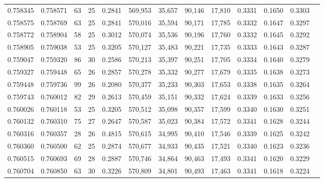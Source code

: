 \begin{tabular}{rrrrrrrrrrrrr}
0.758345 & 0.758571 &    63 &  25 &                                     0.2841 & 569,953 &  35,657 &  90,146 &  17,810 & 0.3331 & 0.1650 & 0.3303 \\
0.758575 & 0.758769 &    63 &  25 &                                     0.2841 & 570,016 &  35,594 &  90,171 &  17,785 & 0.3332 & 0.1647 & 0.3297 \\
0.758772 & 0.758904 &    58 &  25 &                                     0.3012 & 570,074 &  35,536 &  90,196 &  17,760 & 0.3332 & 0.1645 & 0.3292 \\
0.758905 & 0.759038 &    53 &  25 &                                     0.3205 & 570,127 &  35,483 &  90,221 &  17,735 & 0.3333 & 0.1643 & 0.3287 \\
0.759047 & 0.759320 &    86 &  30 &                                     0.2586 & 570,213 &  35,397 &  90,251 &  17,705 & 0.3334 & 0.1640 & 0.3279 \\
0.759327 & 0.759448 &    65 &  26 &                                     0.2857 & 570,278 &  35,332 &  90,277 &  17,679 & 0.3335 & 0.1638 & 0.3273 \\
0.759448 & 0.759736 &    99 &  26 &                                     0.2080 & 570,377 &  35,233 &  90,303 &  17,653 & 0.3338 & 0.1635 & 0.3264 \\
0.759743 & 0.760012 &    82 &  29 &                                     0.2613 & 570,459 &  35,151 &  90,332 &  17,624 & 0.3339 & 0.1633 & 0.3256 \\
0.760026 & 0.760118 &    53 &  25 &                                     0.3205 & 570,512 &  35,098 &  90,357 &  17,599 & 0.3340 & 0.1630 & 0.3251 \\
0.760132 & 0.760310 &    75 &  27 &                                     0.2647 & 570,587 &  35,023 &  90,384 &  17,572 & 0.3341 & 0.1628 & 0.3244 \\
0.760316 & 0.760357 &    28 &  26 &                                     0.4815 & 570,615 &  34,995 &  90,410 &  17,546 & 0.3339 & 0.1625 & 0.3242 \\
0.760360 & 0.760500 &    62 &  25 &                                     0.2874 & 570,677 &  34,933 &  90,435 &  17,521 & 0.3340 & 0.1623 & 0.3236 \\
0.760515 & 0.760693 &    69 &  28 &                                     0.2887 & 570,746 &  34,864 &  90,463 &  17,493 & 0.3341 & 0.1620 & 0.3229 \\
0.760704 & 0.760850 &    63 &  30 &                                     0.3226 & 570,809 &  34,801 &  90,493 &  17,463 & 0.3341 & 0.1618 & 0.3224 \\

\end{tabular}
